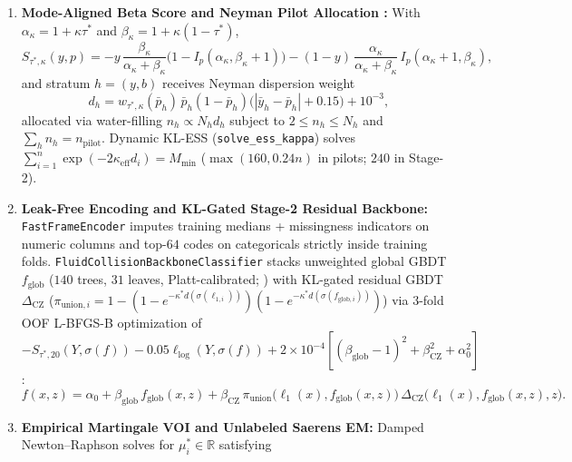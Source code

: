 \documentclass[11pt]{article}
\theoremstyle{remark}
\begin{document}
\begin{enumerate}
  \item \textbf{Mode-Aligned Beta Score and Neyman Pilot Allocation \citep{schervish1989general,buja2005loss,tao2020optimal}:} With $\alpha_\kappa = 1+\kappa\tau^*$ and $\beta_\kappa = 1+\kappa(1-\tau^*)$,
  \begin{equation}
    S_{\tau^*,\kappa}(y, p) = -y\,\frac{\beta_\kappa}{\alpha_\kappa+\beta_\kappa}\big(1 - I_p(\alpha_\kappa, \beta_\kappa+1)\big) - (1-y)\,\frac{\alpha_\kappa}{\alpha_\kappa+\beta_\kappa}\, I_p(\alpha_\kappa+1, \beta_\kappa),
    \label{eq:schervish_app}
  \end{equation}
  and stratum $h=(y,b)$ receives Neyman dispersion weight
  \begin{equation}
    d_h = w_{\tau^*,\kappa}(\bar{p}_h)\,\bar{p}_h(1-\bar{p}_h)\big(|\bar{y}_h - \bar{p}_h| + 0.15\big) + 10^{-3},
    \label{eq:neyman_disp}
  \end{equation}
  allocated via water-filling $n_h \propto N_h d_h$ subject to $2 \le n_h \le N_h$ and $\sum_h n_h = n_{\text{pilot}}$. Dynamic KL-ESS (\texttt{solve\_ess\_kappa}) solves $\sum_{i=1}^n \exp(-2\kappa_{\text{eff}} d_i) = M_{\min}$ ($\max(160, 0.24n)$ in pilots; $240$ in Stage-2).
  \item \textbf{Leak-Free Encoding and KL-Gated Stage-2 Residual Backbone:} \texttt{FastFrameEncoder} imputes training medians + missingness indicators on numeric columns and top-$64$ codes on categoricals strictly inside training folds. \texttt{FluidCollisionBackboneClassifier} stacks unweighted global GBDT $f_{\text{glob}}$ ($140$ trees, $31$ leaves, Platt-calibrated; \citealp{platt1999probabilistic}) with KL-gated residual GBDT $\Delta_{\text{CZ}}$ ($\pi_{\text{union},i} = 1 - (1 - e^{-\kappa^* d(\sigma(\ell_{1,i}))})(1 - e^{-\kappa^* d(\sigma(f_{\text{glob},i}))})$) via $3$-fold OOF L-BFGS-B optimization of $-S_{\tau^*,20}(Y,\sigma(f)) - 0.05\ell_{\log}(Y,\sigma(f)) + 2\times 10^{-4}[(\beta_{\text{glob}}-1)^2 + \beta_{\text{CZ}}^2 + \alpha_0^2]$:
  \begin{equation}
    f(x, z) = \alpha_0 + \beta_{\text{glob}}\,f_{\text{glob}}(x, z) + \beta_{\text{CZ}}\,\pi_{\text{union}}\big(\ell_1(x), f_{\text{glob}}(x,z)\big)\,\Delta_{\text{CZ}}\big(\ell_1(x), f_{\text{glob}}(x,z), z\big).
    \label{eq:fluid_backbone_app}
  \end{equation}
  \item \textbf{Empirical Martingale VOI and Unlabeled Saerens EM:} Damped Newton--Raphson solves for $\mu_i^* \in \mathbb{R}$ satisfying

\end{enumerate}
\end{document}
